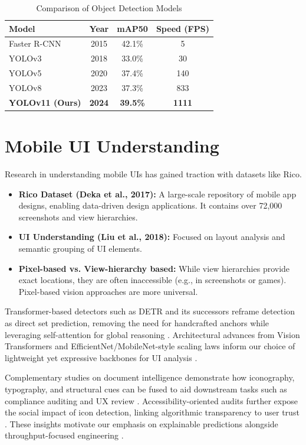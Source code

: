 \documentclass[11pt,a4paper]{report}
\begin{document}
\begin{table}[H]
\centering
\caption{Comparison of Object Detection Models}
\begin{tabular}{l c c c}
            	\toprule
\rowcolor{tietnavy!8}
    	\textbf{Model} & \textbf{Year} & \textbf{mAP50} & \textbf{Speed (FPS)} \\
\midrule
Faster R-CNN & 2015 & 42.1\% & 5 \\
YOLOv3 & 2018 & 33.0\% & 30 \\
YOLOv5 & 2020 & 37.4\% & 140 \\
YOLOv8 & 2023 & 37.3\% & 833 \\
\textbf{YOLOv11 (Ours)} & \textbf{2024} & \textbf{39.5\%} & \textbf{1111} \\
\bottomrule
\end{tabular}
\end{table}

\section{Mobile UI Understanding}
Research in understanding mobile UIs has gained traction with datasets like Rico.
\begin{itemize}
    \item \textbf{Rico Dataset (Deka et al., 2017):} A large-scale repository of mobile app designs, enabling data-driven design applications. It contains over 72,000 screenshots and view hierarchies.
    \item \textbf{UI Understanding (Liu et al., 2018):} Focused on layout analysis and semantic grouping of UI elements.
    \item \textbf{Pixel-based vs. View-hierarchy based:} While view hierarchies provide exact locations, they are often inaccessible (e.g., in screenshots or games). Pixel-based vision approaches are more universal.
\end{itemize}

Transformer-based detectors such as DETR and its successors reframe detection as direct set prediction, removing the need for handcrafted anchors while leveraging self-attention for global reasoning \cite{detr}. Architectural advances from Vision Transformers and EfficientNet/MobileNet-style scaling laws inform our choice of lightweight yet expressive backbones for UI analysis \cite{vit,efficientnet,mobilenet}.

Complementary studies on document intelligence demonstrate how iconography, typography, and structural cues can be fused to aid downstream tasks such as compliance auditing and UX review \cite{omniparser}\cite{unifiedtext}. Accessibility-oriented audits further expose the social impact of icon detection, linking algorithmic transparency to user trust \cite{darkpatterns}\cite{multimodalaccessibility}. These insights motivate our emphasis on explainable predictions alongside throughput-focused engineering \cite{yolov11}\cite{uiautomation}.
\end{document}
